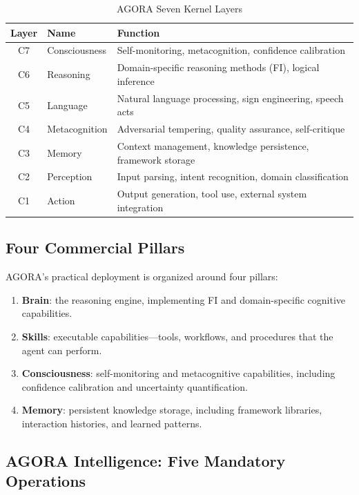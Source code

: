 \documentclass[12pt,a4paper]{article}
\begin{document}
\begin{table}[H]
\centering
\caption{AGORA Seven Kernel Layers}
\label{tab:kernel}
\begin{tabular}{@{}clp{7cm}@{}}
\toprule
\textbf{Layer} & \textbf{Name} & \textbf{Function} \\
\midrule
C7 & Consciousness & Self-monitoring, metacognition, confidence calibration \\
C6 & Reasoning & Domain-specific reasoning methods (FI), logical inference \\
C5 & Language & Natural language processing, sign engineering, speech acts \\
C4 & Metacognition & Adversarial tempering, quality assurance, self-critique \\
C3 & Memory & Context management, knowledge persistence, framework storage \\
C2 & Perception & Input parsing, intent recognition, domain classification \\
C1 & Action & Output generation, tool use, external system integration \\
\bottomrule
\end{tabular}
\end{table}

\subsection{Four Commercial Pillars}

AGORA's practical deployment is organized around four pillars:

\begin{enumerate}
  \item \textbf{Brain}: the reasoning engine, implementing FI and domain-specific cognitive capabilities.
  \item \textbf{Skills}: executable capabilities---tools, workflows, and procedures that the agent can perform.
  \item \textbf{Consciousness}: self-monitoring and metacognitive capabilities, including confidence calibration and uncertainty quantification.
  \item \textbf{Memory}: persistent knowledge storage, including framework libraries, interaction histories, and learned patterns.
\end{enumerate}

\subsection{AGORA Intelligence: Five Mandatory Operations}
\end{document}
